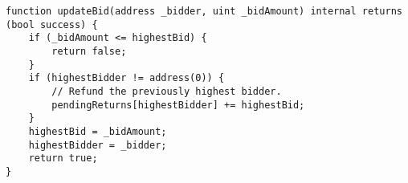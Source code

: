\begin{lstlisting}[language=Solidity]
function updateBid(address _bidder, uint _bidAmount) internal returns (bool success) {
	if (_bidAmount <= highestBid) {
		return false;
	}
	if (highestBidder != address(0)) {
		// Refund the previously highest bidder.
		pendingReturns[highestBidder] += highestBid;
	}
	highestBid = _bidAmount;
	highestBidder = _bidder;
	return true;
}
\end{lstlisting}
